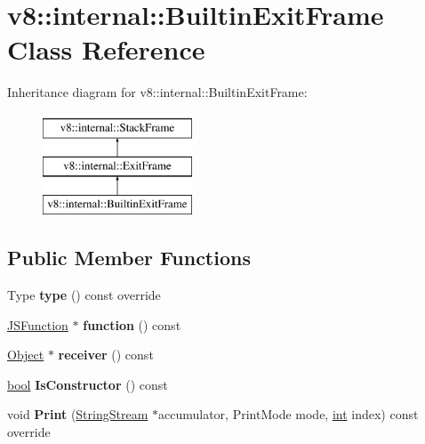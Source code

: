 \hypertarget{classv8_1_1internal_1_1BuiltinExitFrame}{}\section{v8\+:\+:internal\+:\+:Builtin\+Exit\+Frame Class Reference}
\label{classv8_1_1internal_1_1BuiltinExitFrame}
Inheritance diagram for v8\+:\+:internal\+:\+:Builtin\+Exit\+Frame\+:\begin{figure}[H]
\begin{center}
\leavevmode
\includegraphics[height=3.000000cm]{classv8_1_1internal_1_1BuiltinExitFrame}
\end{center}
\end{figure}
\subsection*{Public Member Functions}
\begin{DoxyCompactItemize}
\item 
\mbox{\label{classv8_1_1internal_1_1BuiltinExitFrame_a286285a05978bee16df4f305e22cdf15}} 
Type {\bfseries type} () const override
\item 
\mbox{\label{classv8_1_1internal_1_1BuiltinExitFrame_a7ad3c38f522bcbe41d7a4aeeb4e51458}} 
\mbox{\hyperlink{classv8_1_1internal_1_1JSFunction}{J\+S\+Function}} $\ast$ {\bfseries function} () const
\item 
\mbox{\label{classv8_1_1internal_1_1BuiltinExitFrame_ad260ee85d64af07c256f9be1d833425d}} 
\mbox{\hyperlink{classv8_1_1internal_1_1Object}{Object}} $\ast$ {\bfseries receiver} () const
\item 
\mbox{\label{classv8_1_1internal_1_1BuiltinExitFrame_a0551ca1e3d5b52c931a022c99ef31477}} 
\mbox{\hyperlink{classbool}{bool}} {\bfseries Is\+Constructor} () const
\item 
\mbox{\label{classv8_1_1internal_1_1BuiltinExitFrame_a581bf25a129ca4565237b19da99db352}} 
void {\bfseries Print} (\mbox{\hyperlink{classv8_1_1internal_1_1StringStream}{String\+Stream}} $\ast$accumulator, Print\+Mode mode, \mbox{\hyperlink{classint}{int}} index) const override
\end{DoxyCompactItemize}
